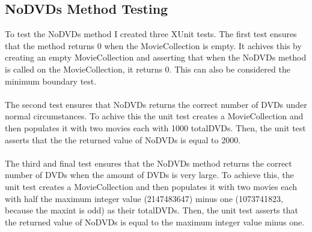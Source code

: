 \documentclass[12pt,a4paper]{article}
\begin{document}
		\subsection{NoDVDs Method Testing}
			To test the NoDVDs method I created three XUnit tests. The first test 
			ensures that the method returns 0 when the MovieCollection is empty. 
			It achives this by creating an empty MovieCollection and asserting that 
			when the NoDVDs method is called on the MovieCollection, it returns 0. 
			This can also be considered the minimum boundary test.\\ 
			\\
			The second test ensures that NoDVDs returns the correct number of DVDs under 
			normal circumstances. To achive this the unit test creates a MovieCollection 
			and then populates it with two movies each with 1000 totalDVDs. Then, the 
			unit test asserts that the the returned value of NoDVDs is equal to 2000.\\
			\\
			The third and final test ensures that the NoDVDs method returns the correct 
			number of DVDs when the amount of DVDs is very large. To achieve this, the 
			unit test creates a MovieCollection and then populates it with two movies 
			each with half the maximum integer value (2147483647) minus one (1073741823, 
			because the maxint is odd) as their totalDVDs. Then, the unit test asserts 
			that the returned value of NoDVDs is equal to the maximum integer value 
			minus one.\\ 


			
\end{document}
